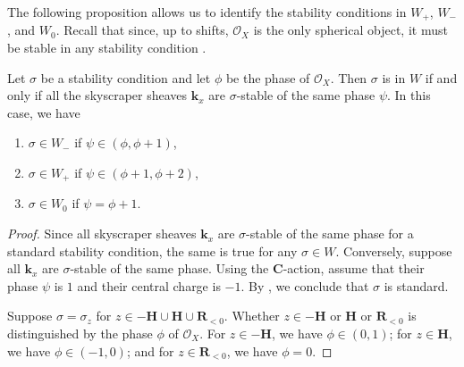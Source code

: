 \documentclass{amsart}
\begin{document}
The following proposition allows us to identify the stability conditions in \(W_+\), \(W_{-}\), and \(W_0\).
Recall that since, up to shifts, \(\mathcal{O}_X\) is the only spherical object, it must be stable in any stability condition \cite[Proposition~2.15]{huy.mac.ste:08}.
\begin{proposition}\label{prop:type-comparison}
  Let \(\sigma\) be a stability condition and let \(\phi\) be the phase of \(\mathcal{O}_X\).
  Then \(\sigma\) is in \(W\) if and only if all the skyscraper sheaves \(\mathbf{k}_x\) are \(\sigma\)-stable of the same phase \(\psi\).
  In this case, we have
  \begin{enumerate}
  \item   \(\sigma \in W_{-}\) if \(\psi \in (\phi,\phi+1)\),
  \item  \(\sigma \in W_+\) if \(\psi \in (\phi+1,\phi+2)\),
  \item  \(\sigma \in W_0\) if \(\psi = \phi+1\).
  \end{enumerate}
\end{proposition}
\begin{proof}
  Since all skyscraper sheaves \(\mathbf{k}_x\) are \(\sigma\)-stable of the same phase for a standard stability condition, the same is true for any \(\sigma \in W\).
  Conversely, suppose all \(\mathbf{k}_x\) are \(\sigma\)-stable of the same phase.
  Using the \(\mathbf{C}\)-action, assume that their phase \(\psi\) is \(1\) and their central charge is \(-1\).
  By \cite[Proposition~4.6]{huy.mac.ste:08}, we conclude that \(\sigma\) is standard.

  Suppose \(\sigma = \sigma_z\) for \(z \in -\mathbf{H} \cup \mathbf{H} \cup \mathbf{R}_{<0}\).
  Whether \(z \in -\mathbf{H}\) or \(\mathbf{H}\) or \(\mathbf{R}_{<0}\) is distinguished by the phase \(\phi\) of \(\mathcal{O}_X\).
  For \(z \in -\mathbf{H}\), we have \(\phi \in (0,1)\);
  for \(z \in \mathbf{H}\), we have \(\phi \in (-1,0)\);
  and for \(z \in \mathbf{R}_{<0}\), we have \(\phi = 0\).
\end{proof}
\end{document}
